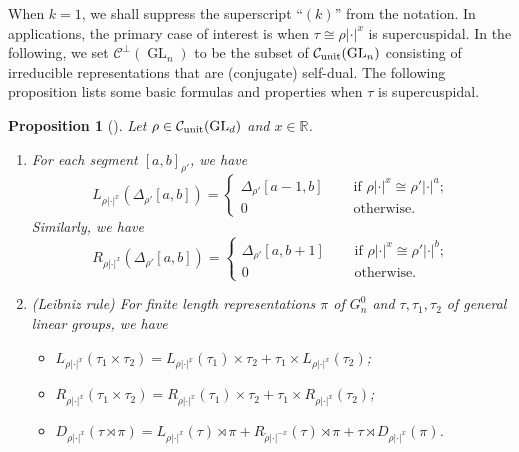 \documentclass[11pt,letterpaper]{amsart}
\theoremstyle{plain}
\newcounter{theorem}[section]
\numberwithin{theorem}{section}
\numberwithin{equation}{subsection}
\newtheorem{Prop}[theorem]{Proposition}
\theoremstyle{remark}
\newcommand{\GL}{\operatorname{GL}}
\newcommand{\R}{\mathbb{R}}
\newcommand{\unit}{{\rm unit}}
\def\calC{\mathcal{C}}
\begin{document}
\vskip 5pt

When $k=1$, we shall suppress the superscript ``$(k)$'' from the notation. In applications, the primary case of interest is when $\tau\cong\rho|\cdot|^x$ is supercuspidal. In the following, we set \(\calC^{\perp}(\GL_n)\) to be the subset of \(\calC_{\unit}(\GL_n)\) consisting of irreducible representations that are (conjugate) self-dual.
The following proposition lists some basic formulas and properties when \(\tau\) is supercuspidal.

\begin{Prop}[{\cite[Sect. 5]{MR3713922}}]\label{leibniz}
Let \(\rho\in\calC_{\unit}(\GL_d)\) and \(x\in\R\).
\begin{enumerate}
        \item For each segment $[a,b]_{\rho'}$, we have
        \[
            L_{\rho|\cdot|^x}(\Delta_{\rho'}[a,b])=\begin{cases}
                \Delta_{\rho'}[a-1,b] \quad &\text{ if }\rho|\cdot|^x\cong\rho'|\cdot|^a;\\
                0 \quad &\text{ otherwise.}
            \end{cases}
        \]
        Similarly, we have
        \[
            R_{\rho|\cdot|^x}(\Delta_{\rho'}[a,b])=\begin{cases}
                \Delta_{\rho'}[a,b+1] \quad &\text{ if }\rho|\cdot|^x\cong\rho'|\cdot|^b;\\
                0 \quad &\text{ otherwise.}
            \end{cases}
        \]

        \vskip 5pt
        
        \item (Leibniz rule) For finite length representations \(\pi\) of \(G^0_n\) and \(\tau,\tau_1,\tau_2\) of general linear groups, we have
        \begin{itemize}
            \item \(L_{\rho|\cdot|^x}(\tau_1\times\tau_2)=L_{\rho|\cdot|^x}(\tau_1)\times\tau_2+\tau_1\times L_{\rho|\cdot|^x}(\tau_2)\);

            \vskip 5pt

            \item \(R_{\rho|\cdot|^x}(\tau_1\times\tau_2)=R_{\rho|\cdot|^x}(\tau_1)\times\tau_2+\tau_1\times R_{\rho|\cdot|^x}(\tau_2)\);

            \vskip 5pt

            \item \(D_{\rho|\cdot|^x}(\tau\rtimes\pi)=L_{\rho|\cdot|^x}(\tau)\rtimes\pi + R_{\widetilde{\rho}|\cdot|^{-x}}(\tau)\rtimes\pi+\tau\rtimes D_{\rho|\cdot|^x}(\pi)\). 
        \end{itemize}
    \end{enumerate}
\end{Prop}
\vskip 5pt
\end{document}
